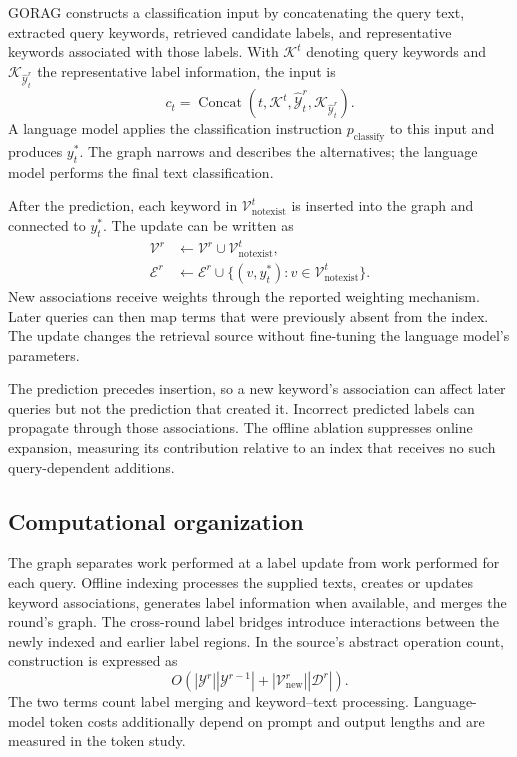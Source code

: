 GORAG constructs a classification input by concatenating the query text, extracted query keywords, retrieved candidate labels, and representative keywords associated with those labels. With $\mathcal{K}^t$ denoting query keywords and $\mathcal{K}_{\widehat{\mathcal{Y}}_t^r}$ the representative label information, the input is
\begin{equation}
c_t=\operatorname{Concat}\left(t,\mathcal{K}^t,\widehat{\mathcal{Y}}_t^r,\mathcal{K}_{\widehat{\mathcal{Y}}_t^r}\right).
\label{eq:gorag:context}
\end{equation}
A language model applies the classification instruction $p_{\mathrm{classify}}$ to this input and produces $y_t^*$. The graph narrows and describes the alternatives; the language model performs the final text classification.

After the prediction, each keyword in $\mathcal{V}_{\mathrm{notexist}}^t$ is inserted into the graph and connected to $y_t^*$. The update can be written as
\begin{align}
\mathcal{V}^r&\leftarrow\mathcal{V}^r\cup\mathcal{V}_{\mathrm{notexist}}^t,\\
\mathcal{E}^r&\leftarrow\mathcal{E}^r\cup\{(v,y_t^*):v\in\mathcal{V}_{\mathrm{notexist}}^t\}.
\label{eq:gorag:update}
\end{align}
New associations receive weights through the reported weighting mechanism. Later queries can then map terms that were previously absent from the index. The update changes the retrieval source without fine-tuning the language model's parameters.

The prediction precedes insertion, so a new keyword's association can affect later queries but not the prediction that created it. Incorrect predicted labels can propagate through those associations. The offline ablation suppresses online expansion, measuring its contribution relative to an index that receives no such query-dependent additions.

\subsection{Computational organization}
\label{sec:gorag:computation}

The graph separates work performed at a label update from work performed for each query. Offline indexing processes the supplied texts, creates or updates keyword associations, generates label information when available, and merges the round's graph. The cross-round label bridges introduce interactions between the newly indexed and earlier label regions. In the source's abstract operation count, construction is expressed as
\begin{equation}
O\!\left(|\mathcal{Y}^r||\mathcal{Y}^{r-1}|+|\mathcal{V}_{\mathrm{new}}^r||\mathcal{D}^r|\right).
\label{eq:gorag:constructioncost}
\end{equation}
The two terms count label merging and keyword--text processing. Language-model token costs additionally depend on prompt and output lengths and are measured in the token study.

